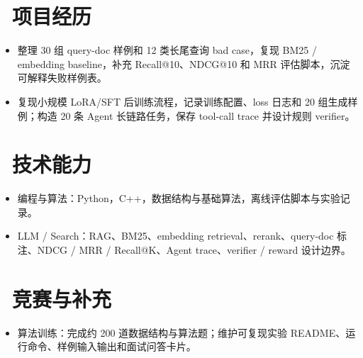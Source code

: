 \documentclass{resume}
\begin{document}
\section{\faFlask\ 项目经历}

\begin{itemize}[parsep=0.2ex]
  \item 整理 30 组 query-doc 样例和 12 类长尾查询 bad case，复现 BM25 / embedding baseline，补充 Recall@10、NDCG@10 和 MRR 评估脚本，沉淀可解释失败样例表。
\end{itemize}

\begin{itemize}[parsep=0.2ex]
  \item 复现小规模 LoRA/SFT 后训练流程，记录训练配置、loss 日志和 20 组生成样例；构造 20 条 Agent 长链路任务，保存 tool-call trace 并设计规则 verifier。
\end{itemize}

\section{\faCogs\ 技术能力}
\begin{itemize}[parsep=0.2ex]
  \item 编程与算法：Python，C++，数据结构与基础算法，离线评估脚本与实验记录。
  \item LLM / Search：RAG、BM25、embedding retrieval、rerank、query-doc 标注、NDCG / MRR / Recall@K、Agent trace、verifier / reward 设计边界。
\end{itemize}

\section{\faHeartO\ 竞赛与补充}
\begin{itemize}[parsep=0.2ex]
  \item 算法训练：完成约 200 道数据结构与算法题；维护可复现实验 README、运行命令、样例输入输出和面试问答卡片。
\end{itemize}
\end{document}
